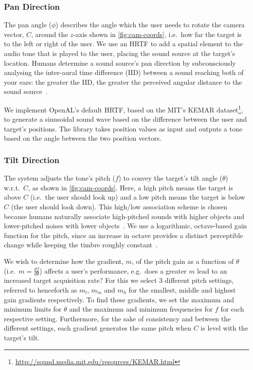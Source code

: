 \documentclass[sigconf, screen=true, anonymous=true]{acmart}
\begin{document}
\subsubsection{Pan Direction}

The pan angle ($\phi$) describes the angle which the user needs to rotate the camera vector, $C$, around the $z$-axis shown in \cref{fig:cam-coords}, i.e.\ how far the target is to the left or right of the user.
We use an HRTF to add a spatial element to the audio tone that is played to the user, placing the sound source at the target's location. 
Humans determine a sound source's pan direction by subconsciously analysing the inter-aural time difference (IID) between a sound reaching both of your ears: the greater the IID, the greater the perceived angular distance to the sound source~\cite{wightman1992dominant}.

We implement OpenAL's default HRTF, based on the MIT's KEMAR dataset\footnote{\url{http://sound.media.mit.edu/resources/KEMAR.html}}, to generate a sinusoidal sound wave based on the difference between the user and target's positions.
The library takes position values as input and outputs a tone based on the angle between the two position vectors. 

\subsubsection{Tilt Direction}

The system adjusts the tone's pitch ($f$) to convey the target's tilt angle ($\theta$) w.r.t.\ $C$, as shown in \cref{fig:cam-coords}. 
Here, a high pitch means the target is above $C$ (i.e.\ the user should look up) and a low pitch means the target is below $C$ (the user should look down).
This high/low association scheme is chosen because humans naturally associate high-pitched sounds with higher objects and lower-pitched noises with lower objects~\cite{pratt1930spatial, blauert1997spatial}.
We use a logarithmic, octave-based gain function for the pitch, since an increase in octave provides a distinct perceptible change while keeping the timbre roughly constant~\cite{shepard1964circularity}.

We wish to determine how the gradient, $m$, of the pitch gain as a function of $\theta$ (i.e.\ $m = \frac{df}{d\theta}$) affects a user's performance, e.g.\ does a greater $m$ lead to an increased target acquisition rate?
For this we select 3 different pitch settings, referred to henceforth as $m_l$, $m_m$ and $m_h$ for the smallest, middle and highest gain gradients respectively. 
To find these gradients, we set the maximum and minimum limits for $\theta$ and the maximum and minimum frequencies for $f$ for each respective setting.
Furthermore, for the sake of consistency and between the different settings, each gradient generates the same pitch when $C$ is level with the target's tilt. 
\end{document}
